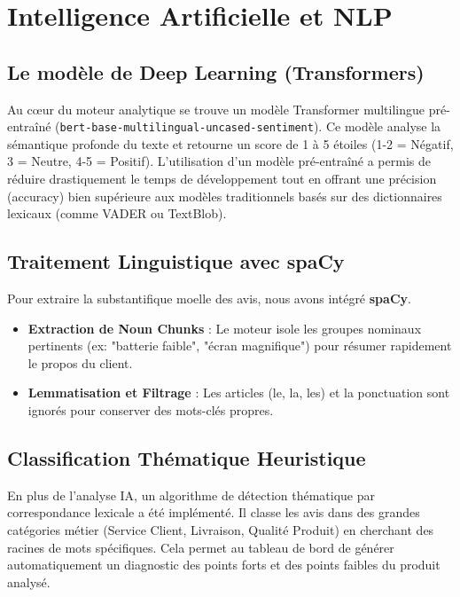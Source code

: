 \documentclass[12pt,a4paper]{article}
\begin{document}
\section{Intelligence Artificielle et NLP}
\subsection{Le modèle de Deep Learning (Transformers)}
Au c{\oe}ur du moteur analytique se trouve un modèle Transformer multilingue pré-entraîné (\texttt{bert-base-multilingual-uncased-sentiment}). Ce modèle analyse la sémantique profonde du texte et retourne un score de 1 à 5 étoiles (1-2 = Négatif, 3 = Neutre, 4-5 = Positif).
L'utilisation d'un modèle pré-entraîné a permis de réduire drastiquement le temps de développement tout en offrant une précision (accuracy) bien supérieure aux modèles traditionnels basés sur des dictionnaires lexicaux (comme VADER ou TextBlob).

\subsection{Traitement Linguistique avec spaCy}
Pour extraire la substantifique moelle des avis, nous avons intégré \textbf{spaCy}.
\begin{itemize}
    \item \textbf{Extraction de Noun Chunks} : Le moteur isole les groupes nominaux pertinents (ex: "batterie faible", "écran magnifique") pour résumer rapidement le propos du client.
    \item \textbf{Lemmatisation et Filtrage} : Les articles (le, la, les) et la ponctuation sont ignorés pour conserver des mots-clés propres.
\end{itemize}

\subsection{Classification Thématique Heuristique}
En plus de l'analyse IA, un algorithme de détection thématique par correspondance lexicale a été implémenté. Il classe les avis dans des grandes catégories métier (Service Client, Livraison, Qualité Produit) en cherchant des racines de mots spécifiques. Cela permet au tableau de bord de générer automatiquement un diagnostic des points forts et des points faibles du produit analysé.
\newpage

\end{document}
